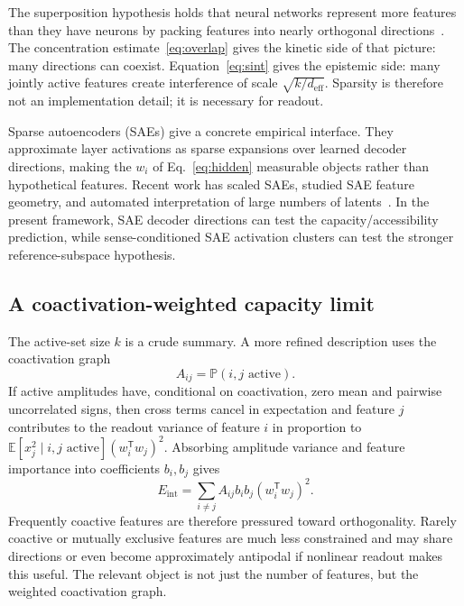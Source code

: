 \documentclass[
  aps,
  reprint,
  superscriptaddress,
  floatfix,
  nofootinbib,
  longbibliography
]{revtex4-2}
\newcommand{\E}{\mathbb{E}}
\newcommand{\Prob}{\mathbb{P}}
\newcommand{\deff}{d_{\mathrm{eff}}}
\newcommand{\Eint}{E_{\mathrm{int}}}
\newcommand{\T}{^{\mathsf{T}}}
\begin{document}
The superposition hypothesis holds that neural networks represent more
features than they have neurons by packing features into nearly
orthogonal directions~\cite{elhage2022superposition,bricken2023monosemanticity}. The concentration
estimate~\eqref{eq:overlap} gives the kinetic side of that picture:
many directions can coexist. Equation~\eqref{eq:sint} gives the
epistemic side: many jointly active features create interference of
scale $\sqrt{k/\deff}$. Sparsity is therefore not an implementation
detail; it is necessary for readout.

Sparse autoencoders (SAEs) give a concrete empirical interface. They
approximate layer activations as sparse expansions over learned decoder
directions, making the $w_i$ of Eq.~\eqref{eq:hidden} measurable
objects rather than hypothetical features. Recent work has scaled SAEs,
studied SAE feature geometry, and automated interpretation of large
numbers of latents~\cite{gao2025scaling,li2025geometry,paulo2025automatically,shu2025survey}. In the
present framework, SAE decoder directions can test the
capacity/accessibility prediction, while sense-conditioned SAE
activation clusters can test the stronger reference-subspace hypothesis.

\subsection{A coactivation-weighted capacity limit}
\label{sec:capacity-limit}

The active-set size $k$ is a crude summary. A more refined description
uses the coactivation graph
%
\begin{equation}
\label{eq:coactivation}
A_{ij}=\Prob(i,j\text{ active}).
\end{equation}
%
If active amplitudes have, conditional on coactivation, zero mean and
pairwise uncorrelated signs, then cross terms cancel in expectation and
feature $j$ contributes to the readout variance of feature $i$ in
proportion to
$\E[x_j^2\mid i,j\text{ active}](w_i\T w_j)^2$. Absorbing amplitude
variance and feature importance into coefficients $b_i,b_j$ gives
%
\begin{equation}
\label{eq:int-energy}
\Eint=
\sum_{i\neq j}
A_{ij}b_i b_j (w_i\T w_j)^2 .
\end{equation}
%
Frequently coactive features are therefore pressured toward
orthogonality. Rarely coactive or mutually exclusive features are much
less constrained and may share directions or even become approximately
antipodal if nonlinear readout makes this useful. The relevant object
is not just the number of features, but the weighted coactivation graph.
\end{document}
